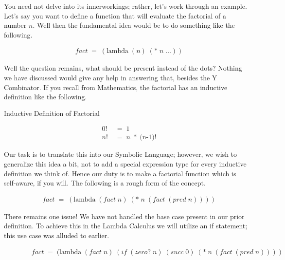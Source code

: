 You need not delve into its innerworkings; rather, let's work through an example. 
Let's say you want to define a function that will evaluate the factorial of a 
number $n$. Well then the fundamental idea would be to do something like the 
following.

\begin{figure}[htp]
\caption{}\label{scheme}
\begin{align*}
& fact \; = \; (\text{lambda} \; (n) \; (* \; n \; \dots))
\end{align*}
\end{figure}

Well the question remains, what should be present instead of the dots? Nothing we 
have discussed would give any help in answering that, besides the Y Combinator. If 
you recall from Mathematics, the factorial has an inductive definition like the 
following.

Inductive Definition of Factorial
\begin{figure}[htp]
\caption{}\label{scheme}
\begin{align*}
& 0! \; &= \; 1
\\& n! \; &= \; n \; * \; (\text{n-1)!}
\end{align*}
\end{figure}

Our task is to translate this into our Symbolic Language; however, we wish to 
generalize this idea a bit, not to add a special expression type for every 
inductive definition we think of. Hence our duty is to make a factorial function 
which is self-aware, if you will. The following is a rough form of the concept.

\begin{figure}[htp]
\caption{}\label{scheme}
\begin{align*}
& fact \; = \; (\text{lambda} \; (fact \; n) \; (* \; n \; (fact \; (pred \; n))))
\end{align*}
\end{figure}

There remains one issue! We have not handled the base case present in our prior 
definition. To achieve this in the Lambda Calculus we will utilize an if 
statement; this use case was alluded to earlier.

\begin{figure}[htp]
\caption{}\label{scheme}
\begin{align*}
& fact \; = \; (\text{lambda} \; (fact \; n) \; (if \; (zero? \; n) \; (succ \; 0) \; (* \; n \; (fact \; (pred \; n))))
\end{align*}
\end{figure}

